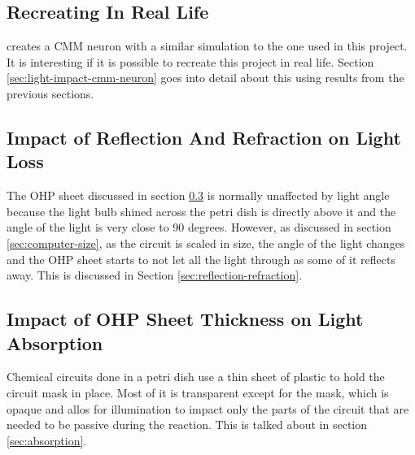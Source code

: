 \subsection{Recreating \cite{stovold2017reaction} In Real Life}
\cite{stovold2017reaction} creates a CMM neuron with a similar simulation to the one used in this project. 
It is interesting if it is possible to recreate this project in real life.
Section \ref{sec:light-impact-cmm-neuron} goes into detail about this using results from the previous sections. 

\subsection{Impact of Reflection And Refraction on Light Loss}
The OHP sheet discussed in section \ref{sec:ohp-impact} is normally unaffected by light angle because the light bulb shined across the petri dish is directly above it and the angle of the light is very close to 90 degrees.
However, as discussed in section \ref{sec:computer-size}, as the circuit is scaled in size, the angle of the light changes and the OHP sheet starts to not let all the light through as some of it reflects away.
This is discussed in Section \ref{sec:reflection-refraction}.

\subsection{Impact of OHP Sheet Thickness on Light Absorption} \label{sec:ohp-impact}
Chemical circuits done in a petri dish use a thin sheet of plastic to hold the circuit mask in place. Most of it is transparent except for the mask, 
which is opaque and allos for illumination to impact only the parts of the circuit that are needed to be passive during the reaction.
This is talked about in section \ref{sec:absorption}.

